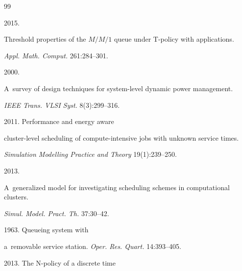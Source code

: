 {\small\frenchspacing

{%


\begin{thebibliography}{99}






 2015. 

Threshold properties of the $M/M/1$ queue under T-policy with applications. 

\textit{Appl. Math. Comput.} 261:284--301.




 2000. 

A~survey of design techniques for system-level dynamic power management. 

\textit{IEEE Trans. VLSI Syst.} 8(3):299--316.






 2011. Performance and energy aware 

cluster-level scheduling of compute-intensive jobs with unknown service times. 

\textit{Simulation Modelling Practice and Theory} 19(1):239--250.




 2013. 

A~generalized model for investigating scheduling schemes in computational clusters. 

\textit{Simul. Model. Pract. Th.} 37:30--42.








 1963. Queueing system with 

a~removable service station. \textit{Oper. Res. Quart.} 14:393--405.




 2013. The N-policy of a discrete time 


\end{thebibliography}}}
